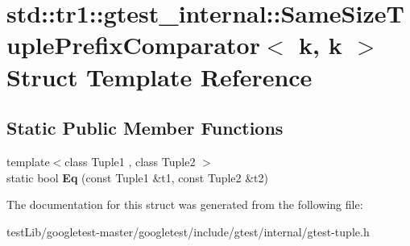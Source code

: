 \hypertarget{structstd_1_1tr1_1_1gtest__internal_1_1SameSizeTuplePrefixComparator_3_01k_00_01k_01_4}{}\section{std\+:\+:tr1\+:\+:gtest\+\_\+internal\+:\+:Same\+Size\+Tuple\+Prefix\+Comparator$<$ k, k $>$ Struct Template Reference}
\label{structstd_1_1tr1_1_1gtest__internal_1_1SameSizeTuplePrefixComparator_3_01k_00_01k_01_4}
\subsection*{Static Public Member Functions}
\begin{DoxyCompactItemize}
\item 
\mbox{\label{structstd_1_1tr1_1_1gtest__internal_1_1SameSizeTuplePrefixComparator_3_01k_00_01k_01_4_a5564fbade05a2d0522d9899da62c2119}} 
{\footnotesize template$<$class Tuple1 , class Tuple2 $>$ }\\static bool {\bfseries Eq} (const Tuple1 \&t1, const Tuple2 \&t2)
\end{DoxyCompactItemize}


The documentation for this struct was generated from the following file\+:\begin{DoxyCompactItemize}
\item 
test\+Lib/googletest-\/master/googletest/include/gtest/internal/gtest-\/tuple.\+h\end{DoxyCompactItemize}
